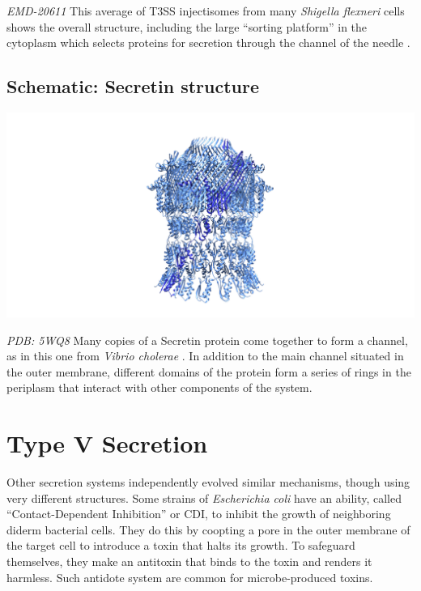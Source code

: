 \documentclass[]{tufte-book}
\begin{document}
\emph{EMD-20611} This average of T3SS injectisomes from many
\emph{Shigella flexneri} cells shows the overall structure, including
the large ``sorting platform'' in the cytoplasm which selects proteins
for secretion through the channel of the needle \citep{tachiyama2019}.

\hypertarget{Secretin_structure}{\subsection*{Schematic: Secretin
structure}\label{Secretin_structure}}

\includegraphics{img/schematics/9_4_2}

\emph{PDB: 5WQ8} Many copies of a Secretin protein come together to form
a channel, as in this one from \emph{Vibrio cholerae} \citep{yan2017a}.
In addition to the main channel situated in the outer membrane,
different domains of the protein form a series of rings in the periplasm
that interact with other components of the system.

\section{Type V Secretion}\label{type-v-secretion}

Other secretion systems independently evolved similar mechanisms, though
using very different structures. Some strains of \emph{Escherichia coli}
have an ability, called ``Contact-Dependent Inhibition'' or CDI, to
inhibit the growth of neighboring diderm bacterial cells. They do this
by coopting a pore in the outer membrane of the target cell to introduce
a toxin that halts its growth. To safeguard themselves, they make an
antitoxin that binds to the toxin and renders it harmless. Such antidote
system are common for microbe-produced toxins.
\end{document}

